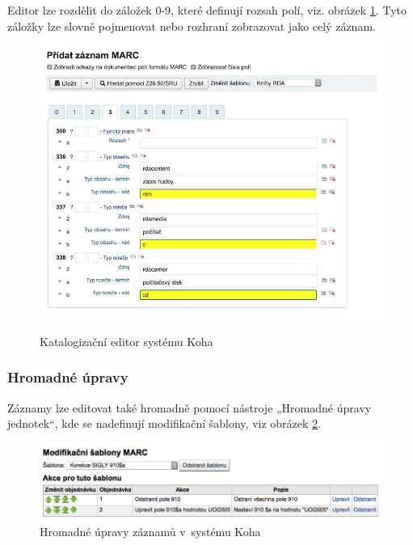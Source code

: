 \documentclass[
	11pt, oneside, printed, final, palatino, monochrome
	microtype,
	table,   %
	lof,     %
	lot     %
]{fithesis3}
\begin{document}
{Editor lze rozdělit do záložek 0-9, které definují rozsah polí, viz. obrázek \ref{fig:editor}. Tyto záložky lze slovně pojmenovat nebo rozhraní zobrazovat jako celý záznam.

\begin{figure}
    \centering
    \includegraphics[width=1.0\textwidth]{resources/katalogizacni_editor}
    \caption{ }{Katalogizační editor systému Koha\protect\footnotemark}
    \label{fig:editor}
\end{figure}

\subsubsection{Hromadné úpravy}
Záznamy lze editovat také hromadně pomocí nástroje „Hromadné úpravy jednotek“, kde se nadefinují modifikační šablony, viz obrázek \ref{fig:hromadne_upravy}.

\begin{figure}
    \centering
    \includegraphics[width=1.0\textwidth]{resources/hromadne_upravy}
    \caption{Hromadné úpravy záznamů v~systému Koha}
    \label{fig:hromadne_upravy}
\end{figure}

}
\end{document}
